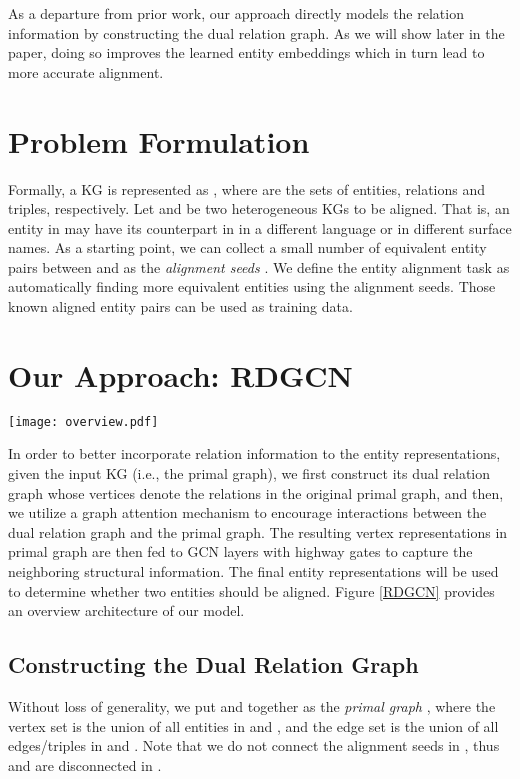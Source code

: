 \documentclass{article}
\begin{document}
As a departure from prior work, our approach directly models the relation information by constructing the dual relation graph. As we will
show later in the paper, doing so improves the learned entity embeddings which in turn lead to more accurate alignment.

\section{Problem Formulation\label{sec:problem}} 
Formally, a KG is represented as , where  are the sets of entities, relations and triples, respectively. Let  and  be two heterogeneous KGs to be aligned. That is, an entity in  may have its counterpart in  in a different language or in different surface names. 
As a starting point, we can collect a small number of equivalent entity pairs between  and  as the \emph{alignment seeds} . We define the entity alignment task as automatically finding more equivalent entities using the alignment seeds. Those known aligned entity pairs can be used as training data. 

\section{Our Approach: RDGCN}
\begin{figure*}
	\centering
	\texttt{[image: overview.pdf]}
	\caption{Overall architecture of our RDGCN.  and  are the dual relation graphs of  and , respectively. In our RDGCN model,  consists of  and , and  consists of  and .}
	\label{RDGCN}	
	\vspace{-2mm}
\end{figure*}
In order to better incorporate relation information to the entity representations, given the input KG (i.e., the primal graph), we first 
construct its dual relation graph whose vertices denote the relations 
in the original primal graph, and then, we utilize a graph attention mechanism to encourage 
interactions between the dual relation graph and the primal graph. The resulting vertex representations in primal graph are then fed to GCN \cite{Kipf2016Semi} 
layers with highway gates to capture the neighboring structural information. 
The final entity representations will be used to determine whether two entities should be aligned. Figure \ref{RDGCN} provides an overview architecture of our model. 


\subsection{Constructing the Dual Relation Graph}
Without loss of generality, we put  and  together as the \emph{primal graph} , where the vertex set  is the union of all entities in  and , and the edge set  is the union of all edges/triples in  and . Note that we do not connect the alignment seeds in , thus  and  are disconnected in .
\end{document}
